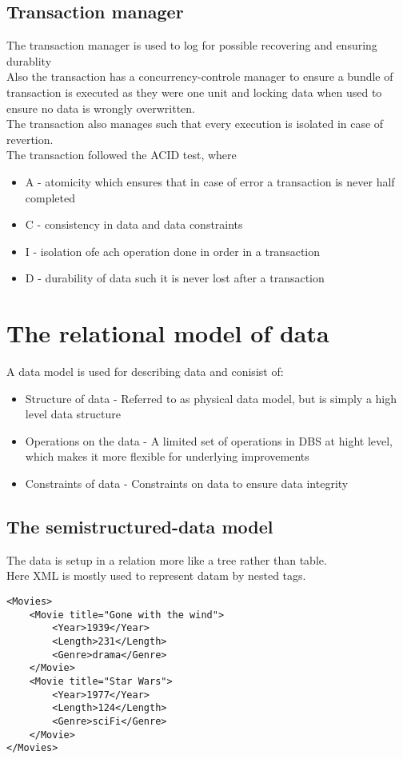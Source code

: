 \documentclass[12pt, a4paper]{article}
\begin{document}
				\subsection{Transaction manager}
					The transaction manager is used to log for possible recovering and ensuring durablity\\
					Also the transaction has a concurrency-controle manager to ensure a bundle of transaction is executed as they were one unit and locking data when used to ensure no data is wrongly overwritten.\\
					The transaction also manages such that every execution is isolated in case of revertion.\\
					The transaction followed the ACID test, where
					\begin{itemize}
						\item A - atomicity which ensures that in case of error a transaction is never half completed
						\item C - consistency in data and data constraints
						\item I - isolation ofe ach operation done in order in a transaction
						\item D - durability of data such it is never lost after a transaction
					\end{itemize}
	\section{The relational model of data}
		A data model is used for describing data and conisist of:
		\begin{itemize}
			\item Structure of data - Referred to as physical data model, but is simply a high level data structure
			\item Operations on the data - A limited set of operations in DBS at hight level, which makes it more flexible for underlying improvements
			\item Constraints of data - Constraints on data to ensure data integrity
		\end{itemize} 
		\subsection{The semistructured-data model}
			The data is setup in a relation more like a tree rather than table.\\
			Here XML is mostly used to represent datam by nested tags.
			\begin{lstlisting}
<Movies>
	<Movie title="Gone with the wind">
		<Year>1939</Year>
		<Length>231</Length>
		<Genre>drama</Genre>
	</Movie>
	<Movie title="Star Wars">
		<Year>1977</Year>
		<Length>124</Length>
		<Genre>sciFi</Genre>
	</Movie>
</Movies>
			\end{lstlisting}
\end{document}
